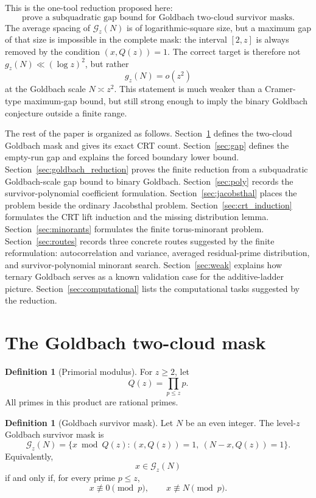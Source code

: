 \documentclass[11pt]{article}
\theoremstyle{plain}
\theoremstyle{definition}
\newtheorem{definition}[theorem]{Definition}
\theoremstyle{remark}
\newcommand{\G}{\mathcal G}
\begin{document}
This is the one-tool reduction proposed here:
\[
\boxed{\text{prove a subquadratic gap bound for Goldbach two-cloud survivor masks.}}
\]
The average spacing of \(\G_z(N)\) is of logarithmic-square size, but a maximum
gap of that size is impossible in the complete mask: the interval \([2,z]\) is
always removed by the condition \((x,Q(z))=1\).  The correct target is therefore
not \(g_z(N)\ll(\log z)^2\), but rather
\[
g_z(N)=o(z^2)
\]
at the Goldbach scale \(N\asymp z^2\).  This statement is much weaker than a
Cramer-type maximum-gap bound, but still strong enough to imply the binary
Goldbach conjecture outside a finite range.

The rest of the paper is organized as follows.  Section~\ref{sec:mask} defines
the two-cloud Goldbach mask and gives its exact CRT count.  Section~\ref{sec:gap}
defines the empty-run gap and explains the forced boundary lower bound.
Section~\ref{sec:goldbach_reduction} proves the finite reduction from a
subquadratic Goldbach-scale gap bound to binary Goldbach.  Section~\ref{sec:poly}
records the survivor-polynomial coefficient formulation.  Section~\ref{sec:jacobsthal}
places the problem beside the ordinary Jacobsthal problem.  Section~\ref{sec:crt_induction}
formulates the CRT lift induction and the missing distribution lemma.
Section~\ref{sec:minorants} formulates the finite torus-minorant problem.
Section~\ref{sec:routes} records three concrete routes suggested by the finite
reformulation: autocorrelation and variance, averaged residual-prime
distribution, and survivor-polynomial minorant search.  Section~\ref{sec:weak}
explains how ternary Goldbach serves as a known validation case for the
additive-ladder picture.  Section~\ref{sec:computational} lists the computational
tasks suggested by the reduction.

\section{The Goldbach two-cloud mask}
\label{sec:mask}

\begin{definition}[Primorial modulus]
For \(z\ge2\), let
\[
Q(z)=\prod_{p\le z}p.
\]
All primes in this product are rational primes.
\end{definition}

\begin{definition}[Goldbach survivor mask]
Let \(N\) be an even integer.  The level-\(z\) Goldbach survivor mask is
\[
\G_z(N)=\{x\bmod Q(z):(x,Q(z))=1,\ (N-x,Q(z))=1\}.
\]
Equivalently,
\[
x\in\G_z(N)
\]
if and only if, for every prime \(p\le z\),
\[
x\not\equiv 0\pmod p,
\qquad
x\not\equiv N\pmod p.
\]
\end{definition}
\end{document}
